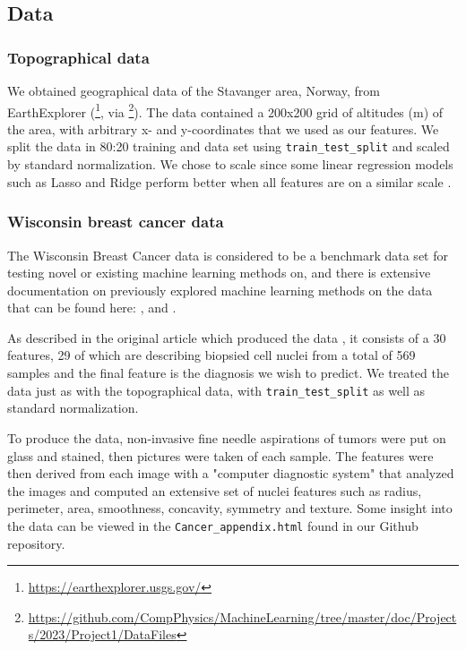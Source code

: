 \subsection{Data}\label{ssec:data}
%
\subsubsection*{Topographical data}
We obtained geographical data of the Stavanger area, Norway, from EarthExplorer (\footnote{\url{https://earthexplorer.usgs.gov/}}, via \footnote{\url{https://github.com/CompPhysics/MachineLearning/tree/master/doc/Projects/2023/Project1/DataFiles}}). 
The data contained a 200x200 grid of altitudes (m) of the area, with arbitrary x- and y-coordinates that we used as our features. 
We split the data in 80:20 training 
and data set using \texttt{train\_test\_split} and scaled by standard normalization. We chose to scale since some linear regression 
models such as Lasso and Ridge perform better when all features are on a similar scale \cite{raschka:2022:ml_pytorch_scikit}. 
\\
\subsubsection*{Wisconsin breast cancer data}
The Wisconsin Breast Cancer data \cite{bc_wisconsin} is considered to be a benchmark data set for testing novel or existing machine learning methods on, and there is extensive documentation on previously explored machine learning methods on the data that can be found here: 
\cite{wisconsin_example1}, \cite{wisconsin_example2} and \cite{wisconsin_example3}.

As described in the original article which produced the data \cite{first_wisconsin}, it consists of a 30 features, 29 of which are describing biopsied cell nuclei from 
a total of 569 samples and the final feature is the diagnosis we wish to predict. We treated the data just as with the topographical data, with \texttt{train\_test\_split} as well as standard normalization. 

To produce the data, non-invasive fine needle aspirations of tumors were put on glass and stained, then pictures were taken of each sample. The features were then derived from each image with a "computer diagnostic system" that 
analyzed the images and computed an extensive set of nuclei features such as radius, perimeter, area, smoothness, concavity, symmetry and texture. Some insight into the data can be viewed in the \texttt{Cancer\_appendix.html} found in our Github repository. 

